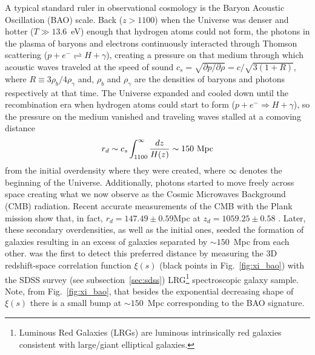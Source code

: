 A typical standard ruler in observational cosmology is the Baryon Acoustic Oscillation (BAO) scale. Back ($z>1100$) when the Universe was denser and hotter ($T\gg13.6$~eV) enough that hydrogen atoms could not form, the photons in the plasma of baryons and electrons continuously interacted through Thomson scattering ($p+e^- \rightleftharpoons H+\gamma$), creating a pressure on that medium through which acoustic waves traveled at the speed of sound $c_s = \sqrt{\partial p /\partial \rho}=c/\sqrt{3(1+R)}$, where $R \equiv 3\rho_b / 4\rho_\gamma$ and, $\rho_b$ and $\rho_\gamma$ are the densities of baryons and photons respectively at that time. The Universe expanded and cooled down until the recombination era when hydrogen atoms could start to form ($p+e^- \Rightarrow H+\gamma$), so the pressure on the medium vanished and traveling waves stalled at a comoving distance
\begin{equation}
r_d \sim c_s \int_{1100}^{\infty} {dz \over H(z)} \sim 150\ \rm Mpc
\end{equation}
from the initial overdensity where they were created, where $\infty$ denotes the beginning of the Universe. Additionally, photons started to move freely across space creating what we now observe as the Cosmic Microwaves Background (CMB) radiation. Recent accurate measurements of the CMB with the Plank mission show that, in fact, $r_d=147.49 \pm 0.59$Mpc at $z_d = 1059.25\pm0.58$ \citep{Ade2013}. Later, these secondary overdensities, as well as the initial ones, seeded the formation of galaxies resulting in an excess of galaxies separated by $\sim150$~Mpc from each other. \citet{Eisenstein2005} was the first to detect this preferred distance by measuring the 3D redshift-space correlation function $\xi(s)$ (black points in Fig.~\ref{fig:xi_bao}) with the SDSS survey (see subsection~\ref{sec:sdss}) LRG\footnote{Luminous Red Galaxies (LRGs) are luminous intrinsically red galaxies consistent with large/giant elliptical galaxies.} spectroscopic galaxy sample. Note, from Fig.~\ref{fig:xi_bao}, that besides the exponential decreasing shape of $\xi(s)$ there is a small bump at $\sim150$~Mpc corresponding to the BAO signature.

